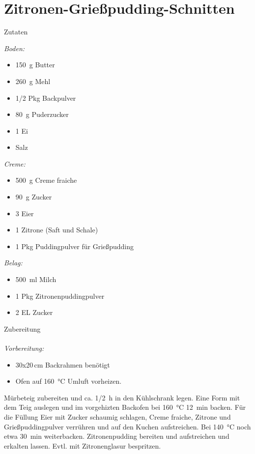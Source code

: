 \section*{Zitronen-Grießpudding-Schnitten}
\ihead{}\ohead{}
\cfoot{}
{\Large Zutaten}
\begin{multicols}{2}
\textit{Boden:}
\begin{itemize}
    \item \SI{150}{g} Butter
    \item \SI{260}{g} Mehl
    \item \num{1/2} Pkg Backpulver
    \item \SI{80}{g} Puderzucker
    \item \num{1} Ei
    \item Salz
\end{itemize}
\textit{Creme:}
\begin{itemize}
    \item \SI{500}{g} Creme fraiche
    \item \SI{90}{g} Zucker
    \item \num{3} Eier
    \item \num{1} Zitrone (Saft und Schale)
    \item \num{1} Pkg Puddingpulver für Grießpudding
\end{itemize}
\textit{Belag:}
\begin{itemize}
    \item \SI{500}{ml} Milch 
    \item \num{1} Pkg Zitronenpuddingpulver
    \item \num{2} EL Zucker
\end{itemize}
\end{multicols}
\noindent
{\Large Zubereitung}\\
\\
\textit{Vorbereitung:} 
\begin{itemize}
    \item \num{30}x\num{20}\,\si{cm} Backrahmen benötigt
    \item Ofen auf \SI{160}{\celsius} Umluft vorheizen.
\end{itemize}
Mürbeteig zubereiten und ca. \SI{1/2}{h} in den Kühlschrank legen.
Eine Form mit dem Teig auslegen und im vorgehizten Backofen bei \SI{160}{\celsius} \SI{12}{min} backen.
Für die Füllung Eier mit Zucker schaumig schlagen, Creme fraiche, Zitrone und Grießpuddingpulver verrühren und auf den Kuchen aufstreichen. 
Bei \SI{140}{\celsius} noch etwa \SI{30}{min} weiterbacken.
Zitronenpudding bereiten und aufstreichen und erkalten lassen.
Evtl. mit Zitronenglasur bespritzen.